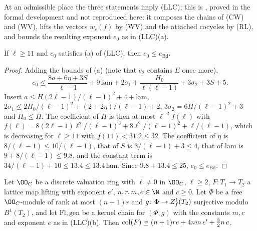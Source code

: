 At an admissible place the three statements imply (LLC); this is
, proved in the formal development
and not reproduced here: it composes the chains of (CW) and (WV), lifts the vectors $w_c(f)$ by (WV) and the attached
cocycles by (RL), and bounds the resulting exponent $e_0$ as in (LLC)(a).

\begin{lemma}\label{pf:linkN-adm:e0}
If $\ell\ge11$ and $e_0$ satisfies (a) of (LLC), then $e_0\le e_{\mathrm{Bd}}$.
\end{lemma}

\begin{proof}
Adding the bounds of (a) (note that $e_2$ contains $E$ once more),
\[
e_0\le\frac{8a+6\eta+3S}{\ell-1}+9\,\mathrm{lam}+2\sigma_1+\frac{H_0}{\ell(\ell-1)}+3\sigma_2+3S+5 .
\]
Insert $a\le H(2\ell-1)/(\ell-1)^2+4+\mathrm{lam}$, $2\sigma_1\le2H_0/(\ell-1)^2+(2+2\eta)/(\ell-1)+2$, $3\sigma_2=
6H/(\ell-1)^2+3$ and $H_0\le H$. The coefficient of $H$ is then at most $\ell^{-2}f(\ell)$ with
$f(\ell)=8(2\ell-1)\ell^2/(\ell-1)^3+8\ell^2/(\ell-1)^2+\ell/(\ell-1)$, which is decreasing for $\ell\ge11$ with
$f(11)<31.2\le32$. The coefficient of $\eta$ is $8/(\ell-1)\le10/(\ell-1)$, that of $S$ is $3/(\ell-1)+3\le4$, that of
$\mathrm{lam}$ is $9+8/(\ell-1)\le9.8$, and the constant term is $34/(\ell-1)+10\le13.4\le13.4\,\mathrm{lam}$. Since
$9.8+13.4\le25$, $e_0\le e_{\mathrm{Bd}}$.
\end{proof}

\begin{lemma}\label{pf:linkN-adm:lengthcount}
Let $\OO_C$ be a discrete valuation ring with $\ell\ne0$ in $\OO_C$, $\ell\ge2$, $F\colon T_1\to T_2$ a lattice map lifting with
exponent $e'$, $n,r,m,e\in\N$ and $c\ge0$. Let $\Phi$ be a free $\OO_C$-module of rank at most $(n+1)r$ and
$g\colon\Phi\to Z^1_{f}(T_2)$ surjective modulo $B^1(T_2)$, and let $\mathrm{Fl},\mathrm{gen}$ be a kernel chain for
$(\Phi,g)$ with the constants $m,c$ and exponent $e$ as in (LLC)(b). Then
$\operatorname{col}(F)\preceq(n+1)re+4nm\,e'+\frac32n\,c$.
\end{lemma}

